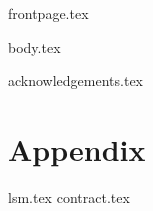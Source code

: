 \documentclass[11pt]{llncs}
\begin{document}
{frontpage.tex}

{body.tex}

\vfill
\iflncs
\thispagestyle{plain}
\fi

\ifccs
  
\else
  
\fi




\ifanonymous\else
\pagebreak
{acknowledgements.tex}
\fi

\iflncs
  \pagebreak
\fi
\section*{Appendix}
\appendix
{lsm.tex}
{contract.tex}
\end{document}
